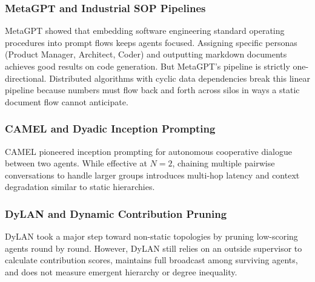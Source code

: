 \documentclass{ieeeaccess}
\begin{document}
\subsubsection{MetaGPT and Industrial SOP Pipelines}
MetaGPT \cite{hong2024metagpt} showed that embedding software engineering standard operating procedures into prompt flows keeps agents focused. Assigning specific personas (Product Manager, Architect, Coder) and outputting markdown documents achieves good results on code generation. But MetaGPT's pipeline is strictly one-directional. Distributed algorithms with cyclic data dependencies break this linear pipeline because numbers must flow back and forth across silos in ways a static document flow cannot anticipate.

\subsubsection{CAMEL and Dyadic Inception Prompting}
CAMEL \cite{li2023camel} pioneered inception prompting for autonomous cooperative dialogue between two agents. While effective at $N=2$, chaining multiple pairwise conversations to handle larger groups introduces multi-hop latency and context degradation similar to static hierarchies.

\subsubsection{DyLAN and Dynamic Contribution Pruning}
DyLAN \cite{liu2024dylan} took a major step toward non-static topologies by pruning low-scoring agents round by round. However, DyLAN still relies on an outside supervisor to calculate contribution scores, maintains full broadcast among surviving agents, and does not measure emergent hierarchy or degree inequality.
\end{document}
